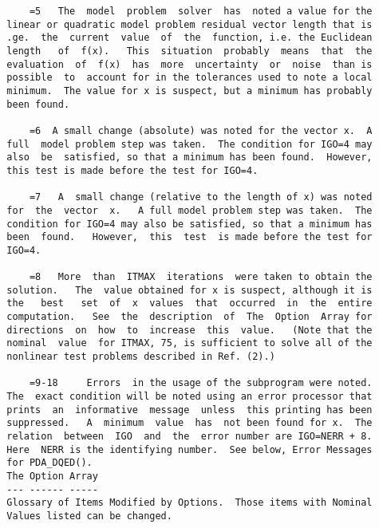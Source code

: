 \begin{verbatim}
      =5   The  model  problem  solver  has  noted a value for the
  linear or quadratic model problem residual vector length that is
  .ge.  the  current  value  of  the  function, i.e. the Euclidean
  length   of  f(x).   This  situation  probably  means  that  the
  evaluation  of  f(x)  has  more  uncertainty  or  noise  than is
  possible  to  account for in the tolerances used to note a local
  minimum.  The value for x is suspect, but a minimum has probably
  been found.

      =6  A small change (absolute) was noted for the vector x.  A
  full  model problem step was taken.  The condition for IGO=4 may
  also  be  satisfied, so that a minimum has been found.  However,
  this test is made before the test for IGO=4.

      =7   A  small change (relative to the length of x) was noted
  for  the  vector  x.   A full model problem step was taken.  The
  condition for IGO=4 may also be satisfied, so that a minimum has
  been  found.   However,  this  test  is made before the test for
  IGO=4.

      =8   More  than  ITMAX  iterations  were taken to obtain the
  solution.   The  value obtained for x is suspect, although it is
  the   best   set  of  x  values  that  occurred  in  the  entire
  computation.   See  the  description  of  The  Option  Array for
  directions  on  how  to  increase  this  value.   (Note that the
  nominal  value  for ITMAX, 75, is sufficient to solve all of the
  nonlinear test problems described in Ref. (2).)

      =9-18     Errors  in the usage of the subprogram were noted.
  The  exact condition will be noted using an error processor that
  prints  an  informative  message  unless  this printing has been
  suppressed.   A  minimum  value  has  not been found for x.  The
  relation  between  IGO  and  the  error number are IGO=NERR + 8.
  Here  NERR is the identifying number.  See below, Error Messages
  for PDA_DQED().
  The Option Array
  --- ------ -----
  Glossary of Items Modified by Options.  Those items with Nominal
  Values listed can be changed.


\end{verbatim}

